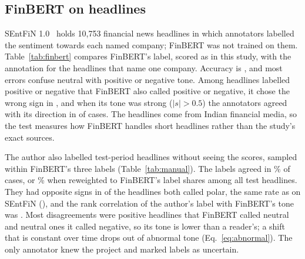 \subsection{FinBERT on headlines}
SEntFiN 1.0~\cite{sentfin} holds 10,753 financial news headlines in which annotators labelled the sentiment towards each named company; FinBERT was not trained on them. Table~\ref{tab:finbert} compares FinBERT's label, scored as in this study, with the annotation for the \FbHeadlines{} headlines that name one company. Accuracy is \FbAccuracy{}, and most errors confuse neutral with positive or negative tone. Among headlines labelled positive or negative that FinBERT also called positive or negative, it chose the wrong sign in \FbOpposite{}, and when its tone was strong ($|s|>0.5$) the annotators agreed with its direction in \FbStrongCorrect{} of cases. The headlines come from Indian financial media, so the test measures how FinBERT handles short headlines rather than the study's exact sources.
\begin{table}[H]\centering\footnotesize
\caption{FinBERT against human annotation of single-company financial news headlines (SEntFiN 1.0). Rows: annotated label; columns: FinBERT's most likely label, \% of the row.}\label{tab:finbert}\end{table}
The author also labelled \ManualN{} test-period headlines without seeing the scores, sampled within FinBERT's three labels (Table~\ref{tab:manual}). The labels agreed in \ManualAgree\% of cases, or \ManualAgreePop\% when reweighted to FinBERT's label shares among all test headlines. They had opposite signs in \ManualOpposite{} of the \ManualPolar{} headlines both called polar, the same rate as on SEntFiN (\FbOpposite), and the rank correlation of the author's label with FinBERT's tone was \ManualRho. Most disagreements were positive headlines that FinBERT called neutral and neutral ones it called negative, so its tone is lower than a reader's; a shift that is constant over time drops out of abnormal tone (Eq.~\ref{eq:abnormal}). The only annotator knew the project and marked \ManualUnsure{} labels as uncertain.
\begin{table}[H]\centering\footnotesize
\caption{The author's labels against FinBERT's most likely label for \ManualN{} test headlines. Counts.}\label{tab:manual}\end{table}

